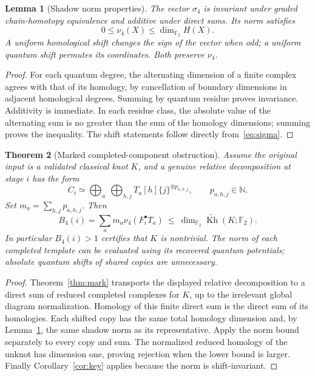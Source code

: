 \documentclass[11pt]{article}
\newtheorem{theorem}{Theorem}[section]
\newtheorem{lemma}[theorem]{Lemma}
\theoremstyle{definition}
\theoremstyle{remark}
\newcommand{\F}{{\mathbb F_2}}
\newcommand{\N}{\mathbb N}
\newcommand{\Kh}{\operatorname{Kh}}
\newcommand{\sig}{\sigma_4}
\newcommand{\nuFour}{\nu_4}
\begin{document}
\begin{lemma}[Shadow norm properties]\label{lem:shadow}
The vector $\sig$ is invariant under graded chain-homotopy equivalence and
additive under direct sums. Its norm satisfies
\[
 0\le\nuFour(X)\le\dim_\F H(X).
\]
A uniform homological shift changes the sign of the vector when odd; a
uniform quantum shift permutes its coordinates. Both preserve $\nuFour$.
\end{lemma}
\begin{proof}
For each quantum degree, the alternating dimension of a finite complex
agrees with that of its homology, by cancellation of boundary dimensions in
adjacent homological degrees. Summing by quantum residue proves invariance.
Additivity is immediate. In each residue class, the absolute value of the
alternating sum is no greater than the sum of the homology dimensions;
summing proves the inequality. The shift statements follow directly
from~\eqref{eq:sigma}.
\end{proof}

\begin{theorem}[Marked completed-component obstruction]\label{thm:bound}
Assume the original input is a validated classical knot $K$, and a genuine
relative decomposition at stage $i$ has the form
\[
 C_i\simeq\bigoplus_a\ \bigoplus_{h,j}
 T_a[h]\{j\}^{\oplus p_{a,h,j}},\qquad p_{a,h,j}\in\N.
\]
Set $m_a=\sum_{h,j}p_{a,h,j}$. Then
\begin{equation}\label{eq:bound}
 B_4(i)=\sum_a m_a\nuFour(F_i^\bullet T_a)
 \ \le\ \dim_\F\widetilde{\Kh}(K;\F).
\end{equation}
In particular $B_4(i)>1$ certifies that $K$ is nontrivial. The norm of each
completed template can be evaluated using its recovered quantum potentials;
absolute quantum shifts of shared copies are unnecessary.
\end{theorem}
\begin{proof}
Theorem~\ref{thm:mark} transports the displayed relative decomposition to a
direct sum of reduced completed complexes for $K$, up to the irrelevant
global diagram normalization. Homology of this finite direct sum is the
direct sum of its homologies. Each shifted copy has the same total homology
dimension and, by Lemma~\ref{lem:shadow}, the same shadow norm as its
representative. Apply the norm bound separately to every copy and sum.
The normalized reduced homology of the unknot has dimension one, proving
rejection when the lower bound is larger. Finally
Corollary~\ref{cor:key} applies because the norm is shift-invariant.
\end{proof}
\end{document}
